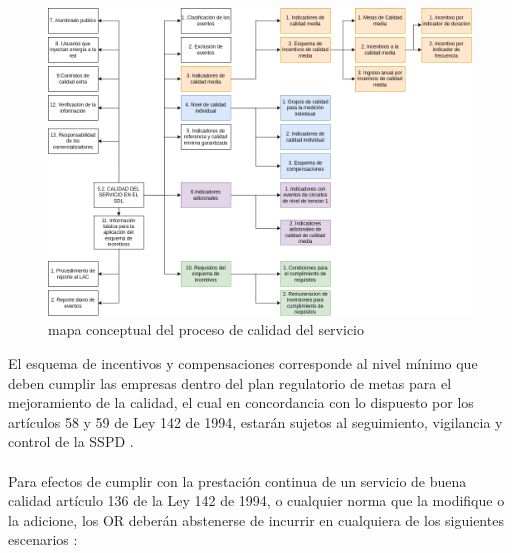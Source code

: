 \documentclass[a5paper]{book}%
\begin{document}
    \begin{figure}[H]
  \centering
  \caption{mapa conceptual del proceso de calidad del servicio}
  \label{fig:esquema}
  \includegraphics[width=\linewidth]{mapa_calidad_sdl}
\end{figure}

    El esquema de incentivos y compensaciones corresponde al nivel mínimo que deben cumplir las empresas dentro del plan regulatorio de metas para el mejoramiento de la calidad, el cual en concordancia con lo dispuesto por los artículos 58 y 59 de Ley 142 de 1994, estarán sujetos al seguimiento, vigilancia y control de la SSPD \cite{CREG0152018}.\\\\
    Para efectos de cumplir con la prestación continua de un servicio de buena calidad artículo 136 de la Ley 142 de 1994, o cualquier norma que la modifique o la adicione, los OR deberán abstenerse de incurrir en cualquiera de los siguientes escenarios \cite{CREG0152018}:
\end{document}
